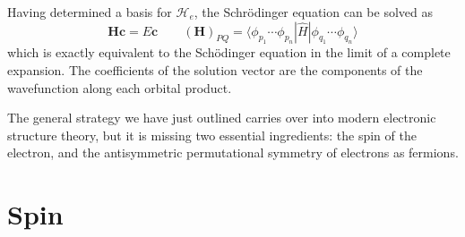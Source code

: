 Having determined a basis for \(\mathcal{H}_e\), the Schr\"odinger equation can
be solved as
\begin{equation}
    \mathbf{H}\mathbf{c}
    =
    E\mathbf{c}
    \qquad
    (\mathbf{H})_{PQ}
    =
    \langle \phi_{p_1}\cdots \phi_{p_n}|
    \hat{H}
    |\phi_{q_1}\cdots \phi_{q_n} \rangle
\end{equation}
which is exactly equivalent to the Sch\"odinger equation in the limit of a
complete expansion.
The coefficients of the solution vector are the components of the wavefunction
along each orbital product.

The general strategy we have just outlined carries over into modern electronic
structure theory, but it is missing two essential ingredients: the spin of the
electron, and the antisymmetric permutational symmetry of electrons as fermions.


\section{Spin}

